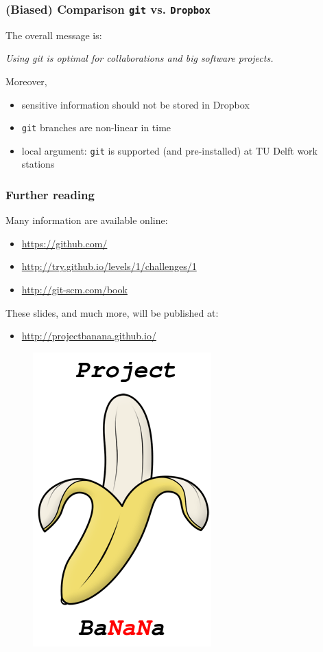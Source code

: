 \documentclass{beamer}
\begin{document}
\begin{frame}
\frametitle{(Biased) Comparison \texttt{git} vs. \texttt{Dropbox}}

The overall message is:
\begin{center}
 \textit{Using git is optimal for collaborations and big software projects.}
\end{center}
Moreover,
\begin{itemize}
 \item sensitive information should not be stored in Dropbox
 \item \texttt{git} branches are non-linear in time
 \item local argument: \texttt{git} is supported (and pre-installed) at TU Delft work stations
\end{itemize}
\end{frame}
\begin{frame}
\frametitle{Further reading}
Many information are available online:
\begin{itemize}
 \item \url{https://github.com/}
 \item \url{http://try.github.io/levels/1/challenges/1}
 \item \url{http://git-scm.com/book}
\end{itemize}
These slides, and much more, will be published at:
\begin{itemize}
 \item \url{http://projectbanana.github.io/}
\end{itemize}
 \begin{figure}
\centering
 \includegraphics[height=0.3\textheight]{../../images/logo}
\end{figure}

\end{frame}
\end{document}
